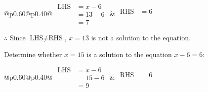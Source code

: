 \documentclass[12pt]{article}
\newcounter{minipagecount}
\begin{document}
\begin{multicols}{2}
\begin{minipage}[t]{0.40\textwidth}
    \noindent
    \renewcommand{\arraystretch}{1.3} %
    \begin{tabular}{@{}p{0.60\linewidth}@{}p{0.40\linewidth}@{}}
        \(\begin{aligned}
            \text{LHS} &= x - 6 \\
                    &= 13 - 6 \\
                    &= 7
        \end{aligned}\) &
        \(\begin{aligned}
            \text{RHS} &= 6\\
                    & \\
                    &
        \end{aligned}\)
    \end{tabular}
    \renewcommand{\arraystretch}{1.0} %
    \vspace{2pt}  %

    \noindent \(\therefore\) Since \(\text{LHS} \neq \text{RHS}\), \(x = 13\) is not  a solution to the equation.

\end{minipage}

 \vspace*{16pt}
\columnbreak
\noindent{(\theminipagecount)}\hspace{0.1mm} %
\begin{minipage}[t]{0.40\textwidth} %

    \noindent Determine whether \(x = 15\) is a solution to the equation \(x - 6 = 6\):
    \vspace{4pt}  %

    \noindent
    \renewcommand{\arraystretch}{1.3} %
    \begin{tabular}{@{}p{0.60\linewidth}@{}p{0.40\linewidth}@{}}
        \(\begin{aligned}
            \text{LHS} &= x - 6 \\
                    &= 15 - 6 \\
                    &= 9
        \end{aligned}\) &
        \(\begin{aligned}
            \text{RHS} &= 6\\
                    & \\
                    &
        \end{aligned}\)
    \end{tabular}
    \renewcommand{\arraystretch}{1.0} %
    \vspace{2pt}  %


\end{minipage}
\end{multicols}
\end{document}
